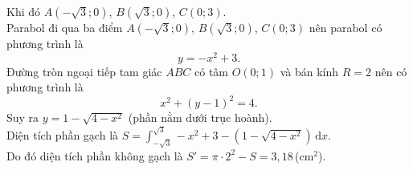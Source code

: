 \begin{bt}
{\begin{center}
		\end{center}
		Khi đó $A(-\sqrt 3;0)$, $B(\sqrt 3;0)$, $C(0;3)$.\\ 
		Parabol đi qua ba điểm $A(-\sqrt 3;0)$, $B(\sqrt 3;0)$, $C(0;3)$ nên  parabol có phương trình là \[y=-x^2+3.\]
		Đường tròn ngoại tiếp tam giác $ABC$ có tâm $O(0;1)$ và bán kính $R=2$ nên có  phương trình là \[x^2+(y-1)^2=4.\]
		Suy ra $y=1-\sqrt{4-x^2}$ (phần nằm dưới trục hoành).\\ 
		Diện tích phần gạch  là $S=\displaystyle\int_{-\sqrt 3}^{\sqrt 3}-x^2+3-\left(1-\sqrt{4-x^2}\right)\mathrm{\,d}x$.\\
		Do đó diện tích  phần không gạch là $S'=\pi \cdot 2^2-S=3{,}18$\,(cm$^2$).
	 }
\end{bt}

